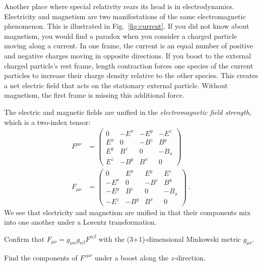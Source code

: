 \begin{subappendices}
Another place where special relativity rears its head is in electrodynamics. Electricity and magnetism are two manifestations of the same electromagnetic phenomenon. This is illustrated in Fig.~\ref{fig:current}. If you did not know about magnetism, you would find a paradox when you consider a charged particle moving along a current. In one frame, the current is an equal number of positive and negative charges moving in opposite directions. If you boost to the external charged particle's rest frame, length contraction forces one species of the current particles to increase their charge density relative to the other species. This creates a net electric field that acts on the stationary external particle. Without magnetism, the first frame is missing this additional force. 

The electric and magnetic fields are unified in the \emph{electromagnetic field strength}, which is a two-index tensor:
\begin{align}
    F^{\mu\nu}
    &=
    \begin{pmatrix}
        0&-E^x&-E^y&-E^z\\
        E^x&0&-B^z&B^y\\
        E^y&B^z&0&-B_x\\
        E^z&-B^y&B^x&0
    \end{pmatrix} %
    \\
    F_{\mu\nu}
    &=
    \begin{pmatrix}
        0&E^x&E^y&E^z\\
        -E^x&0&-B^z&B^y\\
        -E^y&B^z&0&-B_x\\
        -E^z&-B^y&B^x&0
    \end{pmatrix} \ .
    \label{eq:fmunu:lower}
\end{align}
We see that electricity and magnetism are unified in that their components mix into one another under a Lorentz transformation. 
\begin{exercise}
Confirm that $F_{\mu\nu} =g_{\mu \alpha}g_{\nu\beta} F^{\alpha\beta}$ with the (3+1)-dimensional Minkowski metric $g_{\mu\nu}$. 
\end{exercise}
\begin{exercise}
Find the components of $F'^{\mu\nu}$ under a boost along the $z$-direction. 
\end{exercise}



\end{subappendices}
